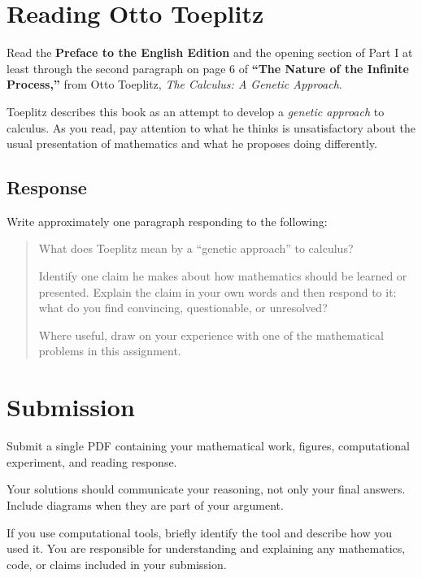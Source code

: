 \documentclass[11pt]{article}
\begin{document}
\section*{Reading \quad Otto Toeplitz}

Read the \textbf{Preface to the English Edition} and the opening
section of Part I at least through the second paragraph on page 6 of \textbf{``The Nature of the Infinite Process,''}
from Otto Toeplitz, \emph{The Calculus: A Genetic Approach}.

\begin{historicalnote}
Toeplitz describes this book as an attempt to develop a
\emph{genetic approach} to calculus. As you read, pay attention to
what he thinks is unsatisfactory about the usual presentation of
mathematics and what he proposes doing differently.
\end{historicalnote}

\subsection*{Response}

Write approximately one paragraph responding to the following:

\begin{quote}
What does Toeplitz mean by a ``genetic approach'' to calculus?

Identify one claim he makes about how mathematics should be learned
or presented. Explain the claim in your own words and then respond
to it: what do you find convincing, questionable, or unresolved?

Where useful, draw on your experience with one of the mathematical
problems in this assignment.
\end{quote}


\section*{Submission}

Submit a single PDF containing your mathematical work, figures,
computational experiment, and reading response.

Your solutions should communicate your reasoning, not only your final
answers. Include diagrams when they are part of your argument.

If you use computational tools, briefly
identify the tool and describe how you used it. You are responsible
for understanding and explaining any mathematics, code, or claims
included in your submission.
\end{document}
